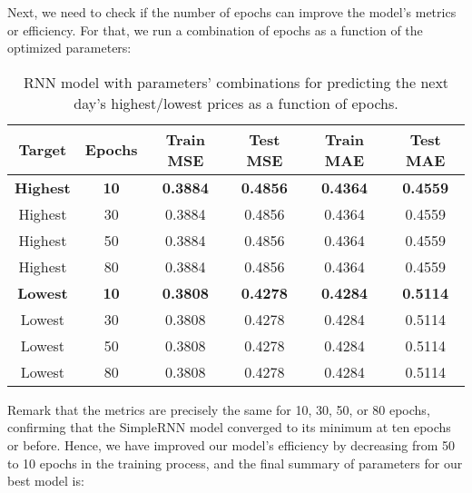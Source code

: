 Next, we need to check if the number of epochs can improve the model's metrics or efficiency. For that, we run a combination of epochs as a function of the optimized parameters:

\begin{table}[H]
\centering
\begin{tabular}{ |c|c|c|c|c|c| }
\hline
\textbf{Target} & \textbf{Epochs} & \textbf{Train MSE} & \textbf{Test MSE} & \textbf{Train MAE} & \textbf{Test MAE}\\
\hline
\rowcolor{lightgray} \textbf{Highest} & \textbf{10} & \textbf{0.3884} &	\textbf{0.4856} &	\textbf{0.4364} &	\textbf{0.4559}\\
Highest & 30 & 0.3884 &	0.4856 &	0.4364 &	0.4559\\
Highest & 50 & 0.3884 &	0.4856 &	0.4364 &	0.4559\\
Highest & 80 & 0.3884 &	0.4856 &	0.4364 &	0.4559\\
\hline
\rowcolor{lightgray} \textbf{Lowest} & \textbf{10} & \textbf{0.3808} &	\textbf{0.4278} &	\textbf{0.4284} &	\textbf{0.5114}\\
Lowest & 30 & 0.3808 &	0.4278 &	0.4284 &	0.5114\\
Lowest & 50 & 0.3808 &	0.4278 &	0.4284 &	0.5114\\
Lowest & 80 & 0.3808 &	0.4278 &	0.4284 &	0.5114\\
\hline
\end{tabular}
\label{table:Results for RNN, Tanh, High, Epoch}
\caption{RNN model with parameters' combinations for predicting the next day's highest/lowest prices as a function of epochs.}
\end{table}

Remark that the metrics are precisely the same for 10, 30, 50, or 80 epochs, confirming that the SimpleRNN model converged to its minimum at ten epochs or before. Hence, we have improved our model's efficiency by decreasing from 50 to 10 epochs in the training process, and the final summary of parameters for our best model is:

\begin{table}[H]
\centering
{}
\label{table:Final, Tanh, 1, 800, 50, 1, MSE}
\caption{Final summary of parameters for our best model.}
\end{table}

